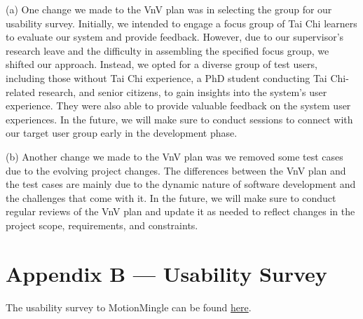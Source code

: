 \documentclass[12pt, titlepage]{article}
\begin{document}
(a) One change we made to the VnV plan was in selecting the group for our
usability survey. Initially, we intended to engage a focus group of Tai Chi
learners to evaluate our system and provide feedback. However, due to our
supervisor's research leave and the difficulty in assembling the specified focus
group, we shifted our approach. Instead, we opted for a diverse group of test
users, including those without Tai Chi experience, a PhD student conducting Tai
Chi-related research, and senior citizens, to gain insights into the system's
user experience. They were also able to provide valuable feedback on the system
user experiences. In the future, we will make sure to conduct sessions to
connect with our target user group early in the development phase.

(b) Another change we made to the VnV plan was we removed some test cases due to
the evolving project changes. The differences between the VnV plan and the test
cases are mainly due to the dynamic nature of software development and the
challenges that come with it. In the future, we will make sure to conduct
regular reviews of the VnV plan and update it as needed to reflect changes in
the project scope, requirements, and constraints.

\section*{Appendix B --- Usability Survey}
The usability survey to MotionMingle can be found \href{https://docs.google.com/forms/d/e/1FAIpQLSchSdc_kHr98yHP8QPyWItHoP-dj_hJnuEtNByH0V2M_iDjWw/viewform}{here}.
\end{document}
